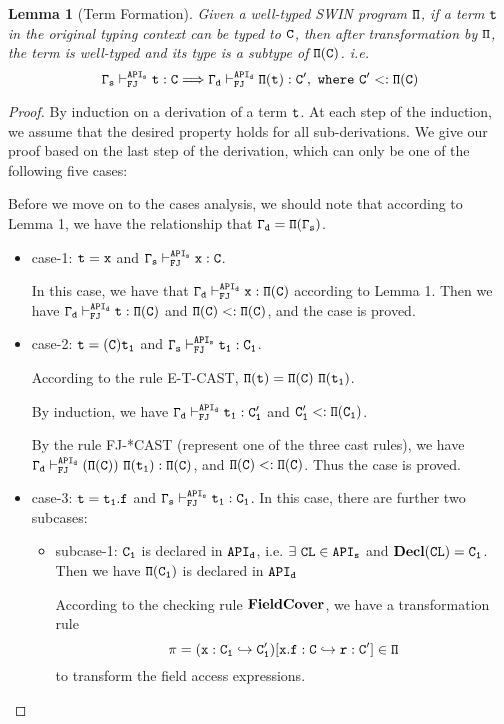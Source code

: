 \documentclass[letterpaper]{article}
\newcommand{\env}[2]{\vdash_{#1}^{#2}}
\newtheorem{lemma}{Lemma}
\begin{document}
\begin{lemma}[Term Formation]
Given a well-typed SWIN program $\tt \Pi$, if a term $\tt t$ in the original typing context can be typed to $\tt C$, then after transformation by $\tt \Pi$, the term is well-typed and its type is a subtype of $\tt \Pi(C)$. i.e.
$$\tt \Gamma_s\vdash^{API_s}_{FJ} t:C \Longrightarrow \Gamma_d\vdash^{API_d}_{FJ} \Pi(t):C',\ where\ C'<:\Pi(C)$$
\end{lemma}
\begin{proof}
By induction on a derivation of a term $\tt t$. At each step of the induction, we assume that the desired property holds for all sub-derivations. We give our proof based on the last step of the derivation, which can only be one of the following five cases:

Before we move on to the cases analysis, we should note that according to Lemma 1, we have the relationship that $\tt\Gamma_d=\Pi(\Gamma_s)$.

\begin{itemize}
\item case-1: $\tt t=x$ and $\tt\Gamma_s\env{FJ}{API_s} x:C$.

In this case, we have that $\tt\Gamma_d\env{FJ}{API_d} x:\Pi(C)$ according to Lemma 1. Then we have $\tt\Gamma_d\env{FJ}{API_d}t:\Pi(C)$ and $\tt \Pi(C)<:\Pi(C)$, and the case is proved.

\item case-2: $\tt t=(C) t_1$ and $\tt \Gamma_s\env{FJ}{API_s}t_1:C_1$.

According to the rule E-T-CAST, $\tt \Pi(t) = \Pi(C)~\Pi(t_1)$.

By induction, we have $\tt\Gamma_d\env{FJ}{API_d}t_1:C'_1$ and $\tt C'_1 <: \Pi(C_1)$.

By the rule FJ-*CAST (represent one of the three cast rules), we have $\tt \Gamma_d\env{FJ}{API_d} (\Pi(C))~\Pi(t_1) : \Pi(C)$, and $\tt\Pi(C)<:\Pi(C)$. Thus the case is proved. 

\item case-3: $\tt t=t_1.f$ and $\tt \Gamma_s\env{FJ}{API_s}t_1:C_1$. In this case, there are further two subcases:
  \begin{itemize}
    \item subcase-1: $\tt C_1$ is declared in $\tt API_d$, i.e. $\tt\exists~CL\in API_s$ and $\tt\mathbf{Decl}(CL)=C_1$. Then we have $\tt \Pi(C_1)$ is declared in $\tt API_d$

      According to the checking rule $\tt \mathbf{FieldCover}$, we have a transformation rule $$\tt \pi=(x:C_1\hookrightarrow C'_1)[x.f:C\hookrightarrow r:C']\in\Pi$$ to transform the field access expressions.


\end{itemize}
\end{itemize}
\end{proof}
\end{document}
